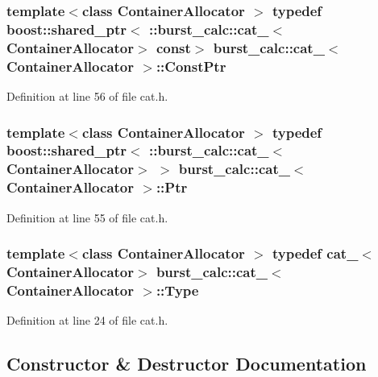 \subsubsection[{\-Const\-Ptr}]{\setlength{\rightskip}{0pt plus 5cm}template$<$class Container\-Allocator $>$ typedef boost\-::shared\-\_\-ptr$<$ \-::{\bf burst\-\_\-calc\-::cat\-\_\-}$<$\-Container\-Allocator$>$ const$>$ {\bf burst\-\_\-calc\-::cat\-\_\-}$<$ \-Container\-Allocator $>$\-::{\bf \-Const\-Ptr}}\label{structburst__calc_1_1cat___a729148dad07631c8c38c8b6408a67a40}


\-Definition at line 56 of file cat.\-h.

\subsubsection[{\-Ptr}]{\setlength{\rightskip}{0pt plus 5cm}template$<$class Container\-Allocator $>$ typedef boost\-::shared\-\_\-ptr$<$ \-::{\bf burst\-\_\-calc\-::cat\-\_\-}$<$\-Container\-Allocator$>$ $>$ {\bf burst\-\_\-calc\-::cat\-\_\-}$<$ \-Container\-Allocator $>$\-::{\bf \-Ptr}}\label{structburst__calc_1_1cat___a7e80bad6dc04ae31ef3c2c60b6477d79}


\-Definition at line 55 of file cat.\-h.

\subsubsection[{\-Type}]{\setlength{\rightskip}{0pt plus 5cm}template$<$class Container\-Allocator $>$ typedef {\bf cat\-\_\-}$<$\-Container\-Allocator$>$ {\bf burst\-\_\-calc\-::cat\-\_\-}$<$ \-Container\-Allocator $>$\-::{\bf \-Type}}\label{structburst__calc_1_1cat___ad457731e8162617fe65f80d31da13920}


\-Definition at line 24 of file cat.\-h.



\subsection{\-Constructor \& \-Destructor \-Documentation}
